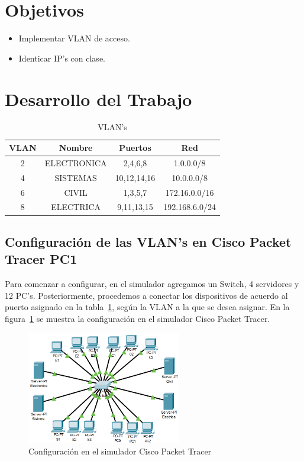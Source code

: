 \section{Objetivos}
    \begin{itemize}
        \item Implementar VLAN de acceso.
        \item Identicar IP's con clase.
    \end{itemize}

\section{Desarrollo del Trabajo}

    \begin{table}[H]
        \begin{center}
            \begin{tabular}{ c | c | c | c }
                \textbf{VLAN} & \textbf{Nombre} & \textbf{Puertos} & \textbf{Red}\\ \hline
                2 & ELECTRONICA & 2,4,6,8 & 1.0.0.0/8\\
                4 & SISTEMAS & 10,12,14,16 & 10.0.0.0/8\\
                6 & CIVIL & 1,3,5,7 & 172.16.0.0/16\\
                8 & ELECTRICA & 9,11,13,15 & 192.168.6.0/24\\
            \end{tabular}
            \caption{VLAN's}
            \label{tab:VLANs}
            \end{center}
    \end{table}

    \subsection{Configuración de las VLAN's en Cisco Packet Tracer PC1}
        Para comenzar a configurar, en el simulador agregamos un Switch, 4 servidores y 12 PC's. Posteriormente, procedemos a conectar los dispositivos de acuerdo al puerto asignado en la tabla~\ref{tab:VLANs}, según la VLAN a la que se desea asignar. En la figura~\ref{fig:cisco} se muestra la configuración en el simulador Cisco Packet Tracer.

        \begin{figure}[H]
            \centering
            \includegraphics[width=0.6\textwidth]{img/cisco.png}
            \caption{Configuración en el simulador Cisco Packet Tracer}
            \label{fig:cisco}
        \end{figure}

